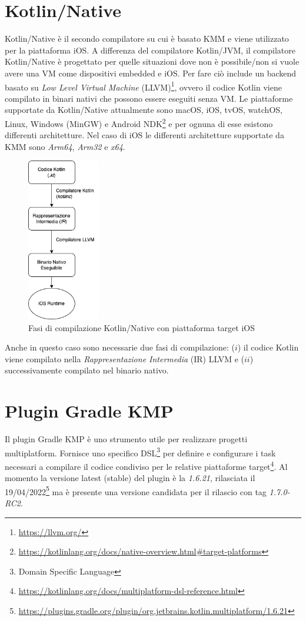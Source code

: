 \section{Kotlin/Native}
Kotlin/Native è il secondo compilatore su cui è basato KMM e viene utilizzato per la piattaforma iOS. A differenza del compilatore Kotlin/JVM, il compilatore Kotlin/Native è progettato per quelle situazioni dove non è possibile/non si vuole avere una VM come dispositivi embedded e iOS. Per fare ciò include un backend basato su \textit{Low Level Virtual Machine} (LLVM)\footnote{\url{https://llvm.org/}}, ovvero il codice Kotlin viene compilato in binari nativi che possono essere eseguiti senza VM\cite{nagy2022simplifying}. Le piattaforme supportate da Kotlin/Native attualmente sono macOS, iOS, tvOS, watchOS, Linux, Windows (MinGW) e Android NDK\footnote{\url{https://kotlinlang.org/docs/native-overview.html\#target-platforms}} e per ognuna di esse esistono differenti architetture. Nel caso di iOS le differenti architetture supportate da KMM sono \textit{Arm64}, \textit{Arm32} e \textit{x64}.
\begin{figure}[H]
\centering
\includegraphics[width=0.28\textwidth]{img/tesi-10-kotlinnative.drawio.png}
\caption{Fasi di compilazione Kotlin/Native con piattaforma target iOS}
\end{figure}
Anche in questo caso sono necessarie due fasi di compilazione: ($i$) il codice Kotlin viene compilato nella \textit{Rappresentazione Intermedia} (IR) LLVM e ($ii$) successivamente compilato nel binario nativo.

\section{Plugin Gradle KMP}
Il plugin Gradle KMP è uno strumento utile per realizzare progetti multiplatform. Fornisce uno specifico DSL\footnote{Domain Specific Language} per definire e configurare i task necessari a compilare il codice condiviso per le relative piattaforme target\footnote{\url{https://kotlinlang.org/docs/multiplatform-dsl-reference.html}}. Al momento la versione latest (stable) del plugin è la \textit{1.6.21}, rilasciata il 19/04/2022\footnote{\url{https://plugins.gradle.org/plugin/org.jetbrains.kotlin.multiplatform/1.6.21}} ma è presente una versione candidata per il rilascio con tag \textit{1.7.0-RC2}.

